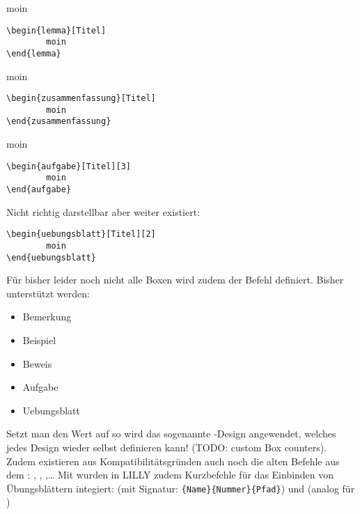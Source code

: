 {\begin{multicols}{2}
\begingroup\begin{lemma}[Titel]
moin
\begin{lstlisting}[style=latex]
\begin{lemma}[Titel]
        moin
\end{lemma}\end{lstlisting}
\end{lemma}\endgroup

\begingroup\begin{zusammenfassung}[Titel]
moin
\begin{lstlisting}[style=latex]
\begin{zusammenfassung}[Titel]
        moin
\end{zusammenfassung}\end{lstlisting}
\end{zusammenfassung}\endgroup

\begingroup\begin{aufgabe}[Titel][3]
moin
\begin{lstlisting}[style=latex]
\begin{aufgabe}[Titel][3]
        moin
\end{aufgabe}\end{lstlisting}
\end{aufgabe}\endgroup

Nicht richtig darstellbar aber weiter existiert:
\begin{lstlisting}[style=latex]
\begin{uebungsblatt}[Titel][2]
        moin
\end{uebungsblatt}\end{lstlisting}

\end{multicols}}
Für bisher leider noch nicht alle Boxen wird zudem der Befehl  definiert. Bisher unterstützt werden:
\begin{multicols}{3}
    \begin{itemize}[label=$\diamond$]\narrowitems
        \item Bemerkung
        \item Beispiel
        \item Beweis
        \item Aufgabe
        \item Uebungsblatt
    \end{itemize}
\end{multicols}
Setzt man den Wert auf  so wird das sogenannte -Design angewendet, welches jedes Design wieder selbst definieren kann! (TODO: custom Box counters).\newline
Zudem existieren aus Kompatibilitätsgründen auch noch die alten Befehle aus dem : , , ,\ldots\medskip\newline
Mit  wurden in LILLY zudem Kurzbefehle für das Einbinden von Übungsblättern integiert:
 (mit Signatur: \verb|{Name}{Nummer}{Pfad}|) und  (analog für )

